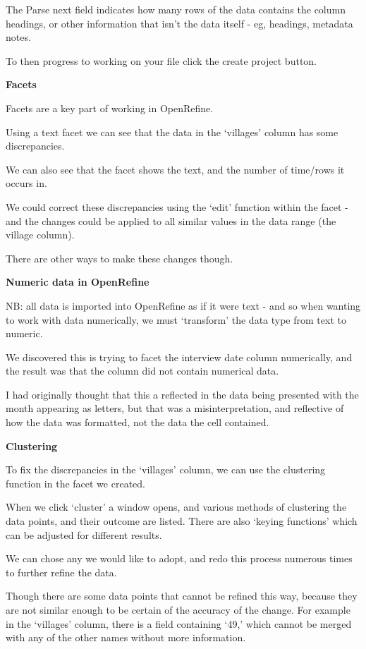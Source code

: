 \documentclass{article}
\begin{document}
The Parse next field indicates how many rows of the data contains the column headings, or other information that isn't the data itself - eg, headings, metadata notes.

To then progress to working on your file click the create project button. 

\textbf{Facets}

Facets are a key part of working in OpenRefine. 


Using a text facet we can see that the data in the `villages' column has some discrepancies.

We can also see that the facet shows the text, and the number of time/rows it occurs in. 

We could correct these discrepancies using the `edit' function within the facet - and the changes could be applied to all similar values in the data range (the village column). 

There are other ways to make these changes though.

\textbf{Numeric data in OpenRefine}
\label{Error: Numeric data in OpenRefine}

NB: all data is imported into OpenRefine as if it were text - and so when wanting to work with data numerically, we must `transform' the data type from text to numeric.

We discovered this is trying to facet the interview date column numerically, and the result was that the column did not contain numerical data.

I had originally thought that this a reflected in the data being presented with the month appearing as letters, but that was a misinterpretation, and reflective of how the data was formatted, not the data the cell contained. 

\textbf{Clustering}

To fix the discrepancies in the `villages' column, we can use the clustering function in the facet we created.

When we click `cluster' a window opens, and various methods of clustering the data points, and their outcome are listed. There are also `keying functions' which can be adjusted for different results.

We can chose any we would like to adopt, and redo this process numerous times to further refine the data.

Though there are some data points that cannot be refined this way, because they are not similar enough to be certain of the accuracy of the change. For example in the `villages' column, there is a field containing `49,' which cannot be merged with any of the other names without more information.
\end{document}
